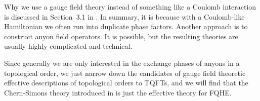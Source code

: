 \documentclass[hyperref, a4paper]{article}
\begin{document}
Why we use a gauge field theory instead of something like a Coulomb interaction is discussed in Section~3.1
in \cite{viefers_anyons}. In summary, it is because with a Coulomb-like Hamiltonian we often run into 
duplicate phase factors. Another approach is to construct anyon field operators. It is possible, but 
the resulting theories are usually highly complicated and technical.  

Since generally we are only interested in the exchange phases of anyons in a topological order, we just 
narrow down the candidates of gauge field theoretic effective descriptions of topological orders to TQFTs, 
and we will find that the Chern-Simons theory introduced in  is just the effective 
theory for FQHE. 


 
\end{document}
